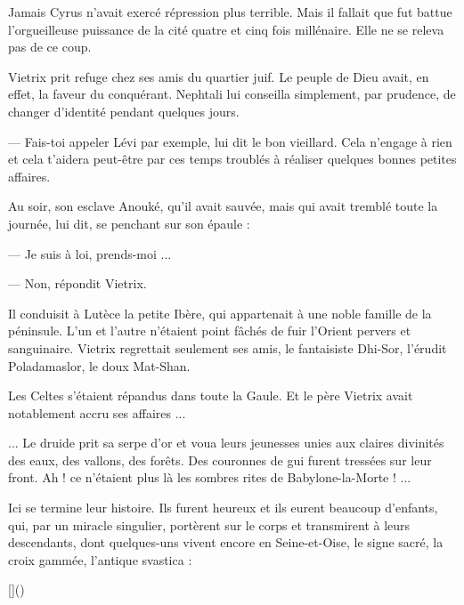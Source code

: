 \documentclass[a4paper, 11pt, oneside, polutonikogreek, french]{article}
\begin{document}
Jamais Cyrus n'avait exercé répression plus terrible. Mais il fallait que fut battue l'orgueilleuse puissance de la cité quatre et cinq fois millénaire. Elle ne se releva pas de ce coup.

\bigskip
\centerline{\EightStarTaper}
\centerline{\EightStarTaper\EightStarTaper}
\bigskip

Vietrix prit refuge chez ses amis du quartier juif. Le peuple de Dieu avait, en effet, la faveur du conquérant. Nephtali lui conseilla simplement, par prudence, de changer d'identité pendant quelques jours.

--- Fais-toi appeler Lévi par exemple, lui dit le bon vieillard. Cela n'engage à rien et cela t'aidera peut-être par ces temps troublés à réaliser quelques bonnes petites affaires.

Au soir, son esclave Anouké, qu'il avait sauvée, mais qui avait tremblé toute la journée, lui dit, se penchant sur son épaule :

--- Je suis à loi, prends-moi ...

--- Non, répondit Vietrix.

\bigskip
\centerline{\EightStarTaper}
\centerline{\EightStarTaper\EightStarTaper}
\bigskip

Il conduisit à Lutèce la petite Ibère, qui appartenait à une noble famille de la péninsule. L'un et l'autre n'étaient point fâchés de fuir l'Orient pervers et sanguinaire. Vietrix regrettait seulement ses amis, le fantaisiste Dhi-Sor, l'érudit Poladamaslor, le doux Mat-Shan.

Les Celtes s'étaient répandus dans toute la Gaule. Et le père Vietrix avait notablement accru ses affaires ...

\bigskip
\centerline{\EightStarTaper}
\centerline{\EightStarTaper\EightStarTaper}
\bigskip

... Le druide prit sa serpe d'or et voua leurs jeunesses unies aux claires divinités des eaux, des vallons, des forêts. Des couronnes de gui furent tressées sur leur front. Ah ! ce n'étaient plus là les sombres rites de Babylone-la-Morte ! ...

\bigskip
\centerline{\EightStarTaper}
\centerline{\EightStarTaper\EightStarTaper}
\bigskip

Ici se termine leur histoire. Ils furent heureux et ils eurent beaucoup d'enfants, qui, par un miracle singulier, portèrent sur le corps et transmirent à leurs descendants, dont quelques-uns vivent encore en Seine-et-Oise, le signe sacré, la croix gammée, l'antique svastica :

[]()
\clearpage
\end{document}

